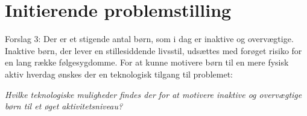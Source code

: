 \section{Initierende problemstilling}
%
Forslag 3:
Der er et stigende antal børn, som i dag er inaktive og overvægtige. Inaktive børn, der lever en stillesiddende livsstil, udsættes med forøget risiko for en lang række følgesygdomme. For at kunne motivere børn til en mere fysisk aktiv hverdag ønskes der en teknologisk tilgang til problemet:

\begin{center}
\textit{Hvilke teknologiske muligheder findes der for at motivere inaktive og overvægtige børn til et øget aktivitetsniveau?}
\end{center}
